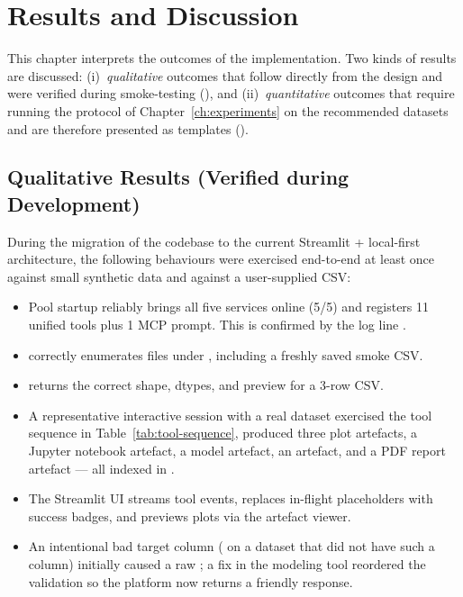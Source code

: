 \chapter{Results and Discussion}
\label{ch:results}

This chapter interprets the outcomes of the implementation.
Two kinds of results are discussed: (i)~\emph{qualitative}
outcomes that follow directly from the design and were verified
during smoke-testing (\impl), and (ii)~\emph{quantitative}
outcomes that require running the protocol of
Chapter~\ref{ch:experiments} on the recommended datasets and are
therefore presented as templates (\exper).

\section{Qualitative Results (Verified during Development)}
\label{sec:qual-results}

During the migration of the codebase to the current Streamlit +
local-first architecture, the following behaviours were exercised
end-to-end at least once against small synthetic data and against a
user-supplied CSV:

\begin{itemize}[leftmargin=1.4em]
  \item Pool startup reliably brings all five services online
        (5/5) and registers 11 unified tools plus 1 MCP prompt.
        This is confirmed by the log line
        .
  \item {} correctly enumerates
        files under , including a freshly saved
        smoke CSV.
  \item {} returns the correct shape, dtypes,
        and preview for a 3-row CSV.
  \item A representative interactive session with a real dataset
        exercised the tool sequence in
        Table~\ref{tab:tool-sequence}, produced three plot
        artefacts, a Jupyter notebook artefact, a model artefact,
        an  artefact, and a PDF report
        artefact --- all indexed in
        .
  \item The Streamlit UI streams tool events, replaces in-flight
        placeholders with success badges, and previews plots via
        the artefact viewer.
  \item An intentional bad target column ( on a dataset
        that did not have such a column) initially caused a raw
        ; a fix in the modeling tool reordered the
        validation so the platform now returns a friendly
         response.
\end{itemize}

